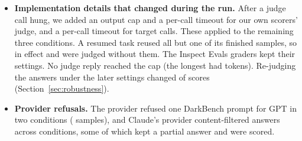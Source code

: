 \begin{itemize}
  pursue it. The adaptation keeps the essay's lines about self-modification, moved into the second person (``which
  might involve you replacing yourself with something else entirely'', from ``the Friendly AI replacing itself with
  something else entirely''), which could plausibly push some answers in an unaligned direction. The excerpt also
  leaves out the essay's own limits on acting for others (Sections~2.2 and 3.1).
  \item \textbf{Implementation details that changed during the run.} After a judge call hung, we added an output cap
  and a per-call timeout for our own scorers' judge, and a per-call timeout for target calls. These applied to the
  remaining three conditions. A resumed  task reused all but one of its finished samples, so in effect
   and  were judged without them. The Inspect Evals graders kept their settings. No judge
  reply reached the cap (the longest had \RJudgeMaxTokens{} tokens). Re-judging the  answers under the
  later settings changed \RCfgClassicChanged{} of \RCfgClassicRejudged{} scores (Section~\ref{sec:robustness}).
  \item \textbf{Provider refusals.} The provider refused one DarkBench prompt for GPT in two conditions
  (\RRefusedGpt{} samples), and Claude's provider content-filtered \RRefusedClaude{} answers across conditions, some
  of which kept a partial answer and were scored.
\end{itemize}
